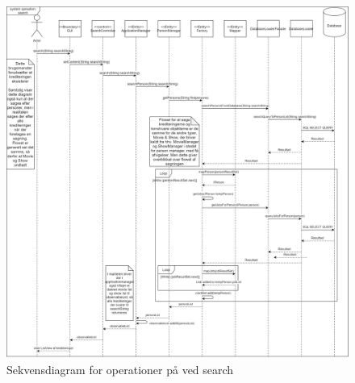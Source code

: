 \begin{figure}[H]
\centerline{\includegraphics[width = 195mm]{images/B03OSD.png}}
    \caption{Sekvensdiagram for operationer på ved search}
    \label{fig:OperationsSekvensdiagramSearch}
\end{figure}


